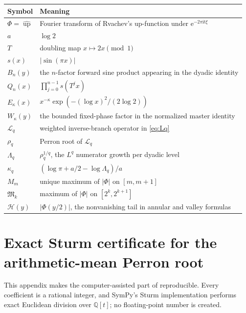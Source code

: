 \documentclass[11pt,oneside]{article}
\numberwithin{equation}{section}
\theoremstyle{definition}
\theoremstyle{remark}
\newcommand{\e}{\mathrm e}
\newcommand{\ii}{\mathrm i}
\newcommand{\up}{\operatorname{up}}
\newcommand{\PhiUp}{\Phi}
\newcommand{\Transfer}{\mathcal L}
\newcommand{\fourier}[1]{\widehat{#1}}
\begin{document}
\begin{center}
\begin{tabularx}{\textwidth}{@{}p{}X@{}}
\toprule
Symbol & Meaning\\
\midrule
\(\PhiUp=\fourier\up\)
 & Fourier transform of Rvachev's up-function under
   \(\e^{-2\pi\ii t\xi}\)\\
\(a\)
 & \(\log2\)\\
\(T\)
 & doubling map \(x\mapsto2x\pmod1\)\\
\(s(x)\)
 & \(|\sin(\pi x)|\)\\
\(B_n(y)\)
 & the \(n\)-factor forward sine product appearing in the dyadic identity\\
\(Q_n(x)\)
 & \(\prod_{j=0}^{n-1}s(T^jx)\)\\
\(E_\kappa(x)\)
 & \(x^{-\kappa}\exp(- (\log x)^2/(2\log2))\)\\
\(W_\kappa(y)\)
 & the bounded fixed-phase factor in the normalized master identity\\
\(\Transfer_q\)
 & weighted inverse-branch operator in \eqref{eq:Lq}\\
\(\rho_q\)
 & Perron root of \(\Transfer_q\)\\
\(\Lambda_q\)
 & \(\rho_q^{1/q}\), the \(L^q\) numerator growth per dyadic level\\
\(\kappa_q\)
 & \((\log\pi+a/2-\log\Lambda_q)/a\)\\
\(M_m\)
 & unique maximum of \(|\PhiUp|\) on \([m,m+1]\)\\
\(\mathfrak M_k\)
 & maximum of \(|\PhiUp|\) on \([2^k,2^{k+1}]\)\\
\(\mathcal H(y)\)
 & \(|\PhiUp(y/2)|\), the nonvanishing tail in annular and valley formulas\\
\bottomrule
\end{tabularx}
\end{center}

\section{Exact Sturm certificate for the arithmetic-mean Perron root}
\label{app:certificate}

This appendix makes the computer-assisted part of  reproducible.
Every coefficient is a rational integer, and SymPy's Sturm implementation performs exact
Euclidean division over \(\mathbb Q[t]\); no floating-point number is created.
\end{document}
